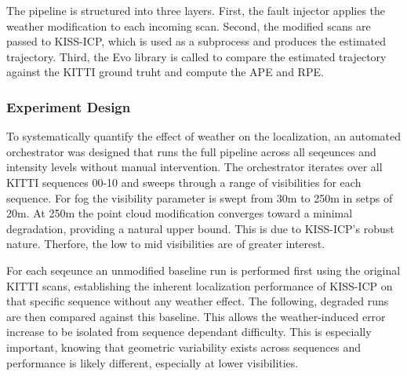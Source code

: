 The pipeline is structured into three layers. First, the fault injector applies the weather modification to each incoming scan. Second, the modified scans are passed to KISS-ICP, which is used as a subprocess and produces the estimated trajectory. Third, the Evo library is called to compare the estimated trajectory against the KITTI ground truht and compute the APE and RPE. 

\subsubsection{Experiment Design}

To systematically quantify the effect of weather on the localization, an automated orchestrator was designed that runs the full pipeline across all seqeunces and intensity levels without manual intervention. The orchestrator iterates over all KITTI sequences 00-10 and sweeps through a range of visibilities for each sequence. For fog the visibility parameter is swept from 30m to 250m in setps of 20m. At 250m the point cloud modification converges toward a minimal degradation, providing a natural upper bound. This is due to KISS-ICP's robust nature. Therfore, the low to mid visibilities are of greater interest. 

For each seqeunce an unmodified baseline run is performed first using the original KITTI scans, establishing the inherent localization performance of KISS-ICP on that specific sequence without any weather effect. The following, degraded runs are then compared against this baseline. This allows the weather-induced error increase to be isolated from sequence dependant difficulty. This is especially important, knowing that geometric variability exists across sequences and performance is likely different, especially at lower visibilities. 
